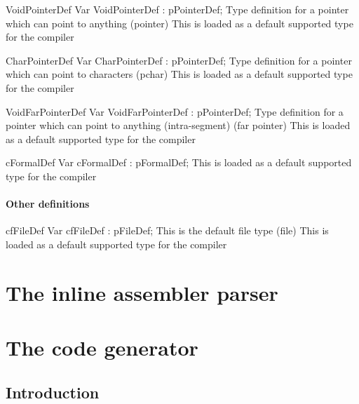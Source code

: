 \documentclass [a4paper,12pt]{article}
\begin{document}
\begin{variable}{VoidPointerDef}
\Declaration
Var VoidPointerDef : pPointerDef;
\Description
Type definition for a pointer which can point to anything (\textsf{pointer})
\Notes
This is loaded as a default supported type for the compiler
\end{variable}

\begin{variable}{CharPointerDef}
\Declaration
Var CharPointerDef : pPointerDef;
\Description
Type definition for a pointer which can point to characters (\textsf{pchar})
\Notes
This is loaded as a default supported type for the compiler
\end{variable}

\begin{variable}{VoidFarPointerDef}
\Declaration
Var VoidFarPointerDef : pPointerDef;
\Description
Type definition for a pointer which can point to anything
(intra-segment) (\textsf{far pointer})
\Notes
This is loaded as a default supported type for the compiler
\end{variable}

\begin{variable}{cFormalDef}
\Declaration
Var cFormalDef : pFormalDef;
\Notes
This is loaded as a default supported type for the compiler
\end{variable}

\paragraph{Other definitions}

\begin{variable}{cfFileDef}
\Declaration
Var cfFileDef : pFileDef;
\Description This is the default file type (\textsf{file})
\Notes This is loaded as a default supported type for the compiler
\end{variable}

\section{The inline assembler parser}
\label{sec:mylabel6}

\section{The code generator}
\label{sec:mylabel7}

\subsection{Introduction}
\label{subsec:introductioneratorer}
\end{document}
